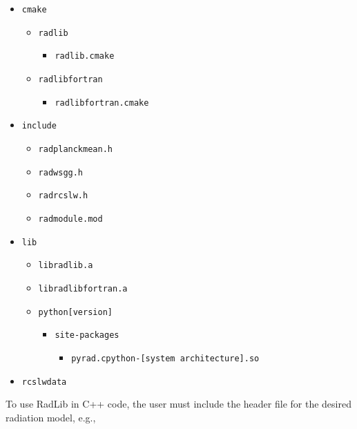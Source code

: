 \documentclass[preprint,12pt]{elsarticle}
\begin{document}
    \begin{itemize}
        \item \texttt{cmake}
        \begin{itemize}
            \item \texttt{radlib}
            \begin{itemize}
                \item \texttt{radlib.cmake}
            \end{itemize}
            \item \texttt{radlib\textunderscore fortran}
            \begin{itemize}
                \item \texttt{radlib\textunderscore fortran.cmake}
            \end{itemize}
        \end{itemize}
        \item \texttt{include}
        \begin{itemize}
            \item \texttt{rad\textunderscore planck\textunderscore mean.h}
            \item \texttt{rad\textunderscore wsgg.h}
            \item \texttt{rad\textunderscore rcslw.h}
            \item \texttt{rad\textunderscore module.mod}
        \end{itemize}
        \item \texttt{lib}
        \begin{itemize}
            \item \texttt{libradlib.a}
            \item \texttt{libradlib\textunderscore fortran.a}
            \item \texttt{python[version]}
            \begin{itemize}
                \item \texttt{site-packages}
                \begin{itemize}
                    \item \texttt{pyrad.cpython-[system architecture].so}
                \end{itemize}
            \end{itemize}
        \end{itemize}
        \item \texttt{rcslw\textunderscore data}
    \end{itemize}
%
    To use RadLib in C++ code, the user must include the header file for the desired radiation model, e.g.,
\end{document}
